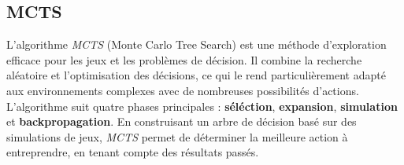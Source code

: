 \documentclass[a4paper,12pt]{article}
\begin{document}
        \subsection{MCTS}
        
            L'algorithme \textit{MCTS} (Monte Carlo Tree Search) est une méthode d'exploration efficace pour les jeux et les problèmes de décision. Il combine la recherche aléatoire et l'optimisation des décisions, ce qui le rend particulièrement adapté aux environnements complexes avec de nombreuses possibilités d'actions. L'algorithme suit quatre phases principales : \textbf{séléction}, \textbf{expansion}, \textbf{simulation} et \textbf{backpropagation}. En construisant un arbre de décision basé sur des simulations de jeux, \textit{MCTS} permet de déterminer la meilleure action à entreprendre, en tenant compte des résultats passés.
            
\end{document}
